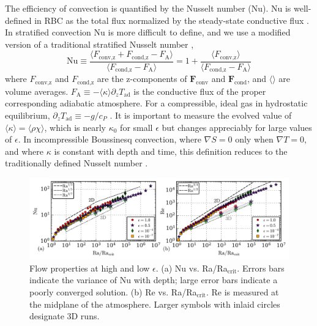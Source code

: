 \documentclass[aps, pre, onecolumn, nofootinbib, notitlepage, groupedaddress, amsfonts, amssymb, amsmath, longbibliography]{revtex4-1}
\newcommand{\grad}{\ensuremath{\nabla}}
\begin{document}
The efficiency of convection is quantified by the Nusselt number (Nu).  
Nu is well-defined in RBC
as the total flux normalized by the steady-state conductive flux 
\cite{johnston&doering2009, otero&all2002}.
In stratified convection Nu is more difficult to define, and we use
a modified version of a traditional stratified Nusselt number 
\cite{graham1975,hurlburt&all1984},
\begin{equation}
\text{Nu} \equiv \frac{\langle F_{\text{conv,z}} + F_{\text{cond,z}} - F_{\text{A}}\rangle}
{\langle F_{\text{cond,z}} - F_{\text{A}}\rangle} 
= 1 + \frac{\langle F_{\text{conv,z}}\rangle}{\langle F_{\text{cond,z}} - F_{\text{A}} \rangle}
\label{eqn:nusselt}
\end{equation}
where $F_{\text{conv,z}}$ and $F_{\text{cond,z}}$ are the 
z-components of $\bm{F}_{\text{conv}}$ and $\bm{F}_{\text{cond}}$,
and $\langle \rangle$ are volume averages.  
$F_{\text{A}} \equiv -\langle\kappa\rangle \partial_z T_{\text{ad}}$ 
is the conductive flux of the proper corresponding adiabatic atmosphere.
For a compressible, ideal gas in hydrostatic equilibrium,
$\partial_z T_{\text{ad}} \equiv - g / c_{P}$ \cite{spiegel&veronis1960}.  
It is important to measure the evolved value of
$\langle \kappa \rangle = \langle \rho\chi \rangle$, which is nearly
$\kappa_0$ for small $\epsilon$ but changes appreciably for large
values of $\epsilon$.
In incompressible Boussinesq convection, where $\grad S = 0$ only when 
$\grad T = 0$, and where $\kappa$ is constant with depth and time,
this definition reduces to the traditionally defined
Nusselt number \cite{otero&all2002, johnston&doering2009}.
\begin{figure}[t!]
\includegraphics[width=\textwidth]{./figs/re_and_nu_v_Ra.png}
\caption{
Flow properties at high and low $\epsilon$. 
(a) Nu vs. Ra/Ra$_{\text{crit}}$.
Errors bars indicate the variance of Nu with depth;
large error bars indicate a poorly converged solution.
(b) Re vs. Ra/Ra$_{\text{crit}}$.
Re is measured at the midplane of the atmosphere.
Larger symbols with inlaid circles designate 3D runs.
 \label{fig:re_and_nu_v_ra}
}
\end{figure}
\end{document}
